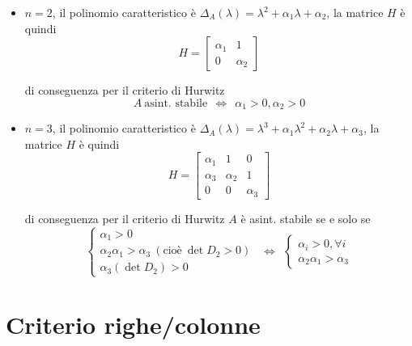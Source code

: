 \begin{itemize}
	\item $n=2$, il polinomio caratteristico è $\Delta _A\left(\lambda \right) =\lambda ^2 +\alpha _1 \lambda +\alpha _2$, la matrice $H$ è quindi\begin{equation*}
	      H=\begin{bmatrix}
	      \alpha _1 & 1\\
	      0 & \alpha _2
	\end{bmatrix}
	\end{equation*}
	
	di conseguenza per il criterio di Hurwitz\begin{equation*}
	A\ \text{asint. stabile} \ \ \iff \ \ \alpha _1  >0,\alpha _2  >0
	\end{equation*}
	\item $n=3$, il polinomio caratteristico è $\Delta _A\left(\lambda \right) =\lambda ^3 +\alpha _1 \lambda ^2 +\alpha _2 \lambda +\alpha _3$, la matrice $H$ è quindi\begin{equation*}
	      H=\begin{bmatrix}
	      \alpha _1 & 1 & 0\\
	      \alpha _3 & \alpha _2 & 1\\
	      0 & 0 & \alpha _3
	\end{bmatrix}
	\end{equation*}
	
	di conseguenza per il criterio di Hurwitz $A$ è asint. stabile se e solo se\begin{equation*}
	\begin{cases}
		\alpha _1  >0                                                              \\
		\alpha _2 \alpha _1  >\alpha _3 \ \left(\text{cioè} \ \det D_2  >0\right) \\
		\alpha _3\left(\det D_2\right)  >0                                         
	\end{cases} \ \ \iff \ \ \begin{cases}
	\alpha _i  >0,\forall i\\
	\alpha _2 \alpha _1  >\alpha _3
	\end{cases}
	\end{equation*}
\end{itemize}

\section{Criterio righe/colonne}

